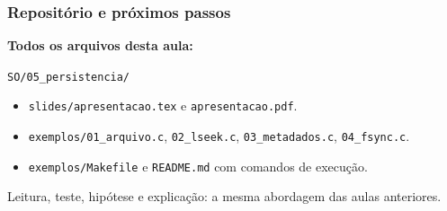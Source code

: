 \documentclass[aspectratio=169,11pt]{beamer}
\begin{document}
\begin{frame}
\frametitle{Repositório e próximos passos}

{\Large\textbf{Todos os arquivos desta aula:}}\par\medskip
\texttt{SO/05\_persistencia/}\par\medskip
\begin{itemize}
\item \texttt{slides/apresentacao.tex} e \texttt{apresentacao.pdf}.
\item \texttt{exemplos/01\_arquivo.c}, \texttt{02\_lseek.c}, \texttt{03\_metadados.c}, \texttt{04\_fsync.c}.
\item \texttt{exemplos/Makefile} e \texttt{README.md} com comandos de execução.
\end{itemize}
\vfill
{\color{teal}\large Leitura, teste, hipótese e explicação: a mesma abordagem das aulas anteriores.}

\end{frame}
\end{document}
